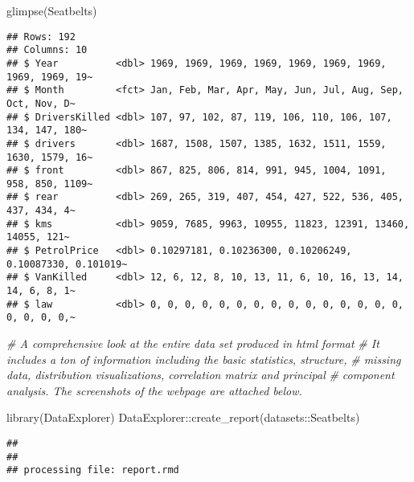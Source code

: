 \documentclass[
]{article}
\newenvironment{Shaded}{\begin{snugshade}}{\end{snugshade}}
\newcommand{\CommentTok}[1]{\textcolor[rgb]{0.56,0.35,0.01}{\textit{#1}}}
\newcommand{\FunctionTok}[1]{\textcolor[rgb]{0.00,0.00,0.00}{#1}}
\newcommand{\NormalTok}[1]{#1}
\newcommand{\SpecialCharTok}[1]{\textcolor[rgb]{0.00,0.00,0.00}{#1}}
\begin{document}
\begin{Shaded}
\begin{Highlighting}[]
\FunctionTok{glimpse}\NormalTok{(Seatbelts)}
\end{Highlighting}
\end{Shaded}

\begin{verbatim}
## Rows: 192
## Columns: 10
## $ Year          <dbl> 1969, 1969, 1969, 1969, 1969, 1969, 1969, 1969, 1969, 19~
## $ Month         <fct> Jan, Feb, Mar, Apr, May, Jun, Jul, Aug, Sep, Oct, Nov, D~
## $ DriversKilled <dbl> 107, 97, 102, 87, 119, 106, 110, 106, 107, 134, 147, 180~
## $ drivers       <dbl> 1687, 1508, 1507, 1385, 1632, 1511, 1559, 1630, 1579, 16~
## $ front         <dbl> 867, 825, 806, 814, 991, 945, 1004, 1091, 958, 850, 1109~
## $ rear          <dbl> 269, 265, 319, 407, 454, 427, 522, 536, 405, 437, 434, 4~
## $ kms           <dbl> 9059, 7685, 9963, 10955, 11823, 12391, 13460, 14055, 121~
## $ PetrolPrice   <dbl> 0.10297181, 0.10236300, 0.10206249, 0.10087330, 0.101019~
## $ VanKilled     <dbl> 12, 6, 12, 8, 10, 13, 11, 6, 10, 16, 13, 14, 14, 6, 8, 1~
## $ law           <dbl> 0, 0, 0, 0, 0, 0, 0, 0, 0, 0, 0, 0, 0, 0, 0, 0, 0, 0, 0,~
\end{verbatim}

\begin{Shaded}
\begin{Highlighting}[]
\CommentTok{\# A comprehensive look at the entire data set produced in html format }
\CommentTok{\# It includes a ton of information including the basic statistics, structure, }
\CommentTok{\# missing data, distribution visualizations, correlation matrix and principal }
\CommentTok{\# component analysis. The screenshots of the webpage are attached below.}

\FunctionTok{library}\NormalTok{(DataExplorer)}
\NormalTok{DataExplorer}\SpecialCharTok{::}\FunctionTok{create\_report}\NormalTok{(datasets}\SpecialCharTok{::}\NormalTok{Seatbelts)}
\end{Highlighting}
\end{Shaded}

\begin{verbatim}
## 
## 
## processing file: report.rmd
\end{verbatim}
\end{document}
